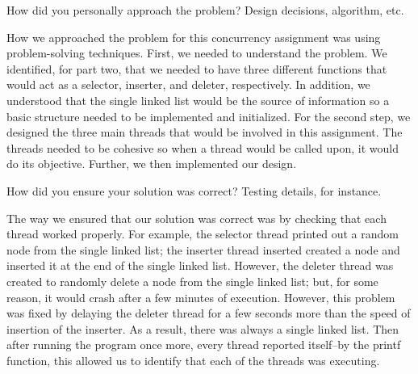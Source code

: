 \documentclass{article}
\newenvironment{question}[2][Question]{\begin{trivlist}
\item[\hskip \labelsep {\bfseries #1}\hskip \labelsep {\bfseries #2.}]}{\end{trivlist}}
\begin{document}

\vspace{0.25in} %

\begin{question}{2}
How did you personally approach the problem? Design decisions, algorithm, etc.
\end{question}
How we approached the problem for this concurrency assignment was using problem-solving techniques. First, we needed to understand the problem. We identified, for part two, that we needed to have three different functions that would act as a selector, inserter, and deleter, respectively. In addition, we understood that the single linked list would be the source of information so a basic structure needed to be implemented and initialized. For the second step, we designed the three main threads that would be involved in this assignment. The threads needed to be cohesive so when a thread would be called upon, it would do its objective. Further, we then implemented our design.


\vspace{0.25in} %

\begin{question}{3}
How did you ensure your solution was correct? Testing details, for instance.
\end{question}
The way we ensured that our solution was correct was by checking that each thread worked properly. For example, the selector thread printed out a random node from the single linked list; the inserter thread inserted created a node and inserted it at the end of the single linked list. However, the deleter thread was created to randomly delete a node from the single linked list; but, for some reason, it would crash after a few minutes of execution. However, this problem was fixed by delaying the deleter thread for a few seconds more than the speed of insertion of the inserter. As a result, there was always a single linked list. Then after running the program once more, every thread reported itself--by the printf function, this allowed us to identify that each of the threads was executing.

\newpage
\end{document}
